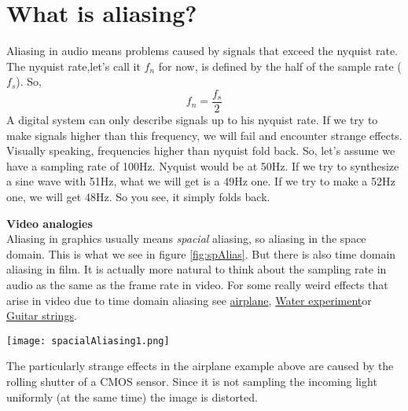 \section{What is aliasing?}
Aliasing in audio means problems caused by signals that exceed the nyquist rate.\\
The nyquist rate,let's call it $f_n$ for now, is defined by the half of the sample rate ($f_s$). So, 
\begin{equation}
	f_n=\frac{f_s}{2}
\end{equation}
A digital system can only describe signals up to his nyquist rate. If we try to make signals higher than this frequency, we will fail and encounter strange effects.\\
Visually speaking, frequencies higher than nyquist fold back. So, let's assume we have a sampling rate of 100Hz. Nyquist would be at 50Hz. If we try to synthesize a sine wave with 51Hz, what we will get is a 49Hz one. If we try to make a 52Hz one, we will get 48Hz. So you see, it simply folds back.

\begin{framed}
	\textbf{Video analogies}\\
	Aliasing in graphics usually means \textit{spacial} aliasing, so aliasing in the space domain. This is what we see in figure \ref{fig:spAlias}. But there is also time domain aliasing in film. It is actually more natural to think about the sampling rate in audio as the same as the frame rate in video. For some really weird effects that arise in video due to time domain aliasing see \href{https://www.youtube.com/watch?v=LVwmtwZLG88}{airplane}\footnotemark , \href{https://www.youtube.com/watch?v=GBtHeR-hY9Y}{Water experiment}\footnotemark or \href{https://www.youtube.com/watch?v=jcOKTTnOIV8}{Guitar strings}\footnotemark .
	\begin{center}
		\texttt{[image: spacialAliasing1.png]}
		\label{fig:spAlias}
	\end{center}
	The particularly strange effects in the airplane example above are caused by the rolling shutter of a CMOS sensor. Since it is not sampling the incoming light uniformly (at the same time) the image is distorted.
\end{framed}

